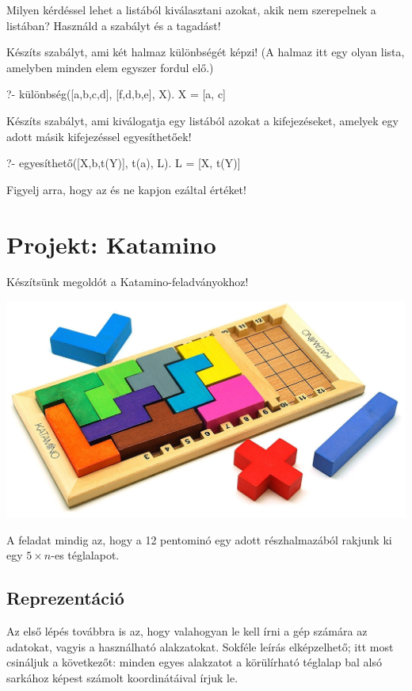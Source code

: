 \begin{problem}
Milyen kérdéssel lehet a  listából
kiválasztani azokat, akik nem szerepelnek a
 listában? Használd a
 szabályt és a tagadást!
\end{problem}
\begin{problem}
Készíts szabályt, ami két halmaz különbségét
képzi! (A halmaz itt egy olyan lista, amelyben minden
elem egyszer fordul elő.)
\begin{query}
?- különbség([a,b,c,d], [f,d,b,e], X).
X = [a, c]
\end{query}
\end{problem}
\begin{problem}
Készíts szabályt, ami kiválogatja egy listából
azokat a kifejezéseket, amelyek egy adott másik
kifejezéssel egyesíthetőek!
\begin{query}
?- egyesíthető([X,b,t(Y)], t(a), L).
L = [X, t(Y)]
\end{query}
Figyelj arra, hogy az  és  ne kapjon
ezáltal értéket!
\end{problem}

\section{Projekt: Katamino}
Készítsünk megoldót a Katamino-feladványokhoz!

\begin{center}
\includegraphics[width=.8\textwidth]{images/katamino.jpg}
\end{center}

A feladat mindig az, hogy a 12 pentominó egy adott
részhalmazából rakjunk ki egy $5\times n$-es
téglalapot.

\subsection*{Reprezentáció}
Az első lépés továbbra is az, hogy valahogyan le
kell írni a gép számára az adatokat, vagyis a
használható alakzatokat. Sokféle leírás
elképzelhető; itt most csináljuk a következőt:
minden egyes alakzatot a körülírható téglalap bal
alsó sarkához képest számolt koordinátáival írjuk
le.

